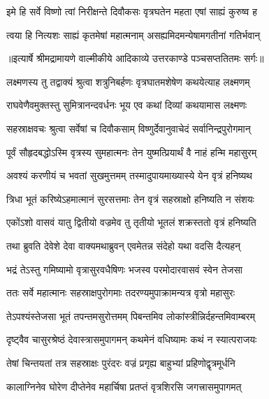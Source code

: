 \twolineshloka
{इमे हि सर्वे विष्णो त्वां निरीक्षन्ते दिवौकसः}
{वृत्रघतेन महता एषां साह्यं कुरुष्व ह} %

\twolineshloka
{त्वया हि नित्यशः साह्यं कृतमेषां महात्मनाम्}
{असह्यमिदमन्येषामगतीनां गतिर्भवान्} %


{॥इत्यार्षे श्रीमद्रामायणे वाल्मीकीये आदिकाव्ये उत्तरकाण्डे पञ्चसप्ततितमः सर्गः॥}


\twolineshloka
{लक्ष्मणस्य तु तद्वाक्यं श्रुत्वा शत्रुनिबर्हणः}
{वृत्रघातमशेषेण कथयेत्याह लक्ष्मणम्} %

\twolineshloka
{राघवेणैवमुक्तस्तु सुमित्रानन्दवर्धनः}
{भूय एव कथां दिव्यां कथयामास लक्ष्मणः} %

\twolineshloka
{सहस्राक्षवचः श्रुत्वा सर्वेषां च दिवौकसाम्}
{विष्णुर्देवानुवाचेदं सर्वानिन्द्रपुरोगमान्} %

\twolineshloka
{पूर्वं सौहृदबद्धोऽस्मि वृत्रस्य सुमहात्मनः}
{तेन युष्मत्प्रियार्थं वै नाहं हन्मि महासुरम्} %

\twolineshloka
{अवश्यं करणीयं च भवतां सुखमुत्तमम्}
{तस्मादुपायमाख्यास्ये येन वृत्रं हनिष्यथ} %

\twolineshloka
{त्रिधा भूतं करिष्येऽहमात्मानं सुरसत्तमाः}
{तेन वृत्रं सहस्राक्षो हनिष्यति न संशयः} %

\twolineshloka
{एकोंऽशो वासवं यातु द्वितीयो वज्रमेव तु}
{तृतीयो भूतलं शक्रस्ततो वृत्रं हनिष्यति} %

\twolineshloka
{तथा ब्रुवति देवेशे देवा वाक्यमथाब्रुवन्}
{एवमेतन्न संदेहो यथा वदसि दैत्यहन्} %

\twolineshloka
{भद्रं तेऽस्तु गमिष्यामो वृत्रासुरवधैषिणः}
{भजस्व परमोदारवासवं स्वेन तेजसा} %

\twolineshloka
{ततः सर्वे महात्मानः सहस्राक्षपुरोगमाः}
{तदरण्यमुपाक्रामन्यत्र वृत्रो महासुरः} %

\twolineshloka
{तेऽपश्यंस्तेजसा भूतं तपन्तमसुरोत्तमम्}
{पिबन्तमिव लोकांस्त्रीन्निर्दहन्तमिवाम्बरम्} %

\twolineshloka
{दृष्ट्वैव चासुरश्रेष्ठं देवास्त्रासमुपागमन्}
{कथमेनं वधिष्यामः कथं न स्यात्पराजयः} %

\twolineshloka
{तेषां चिन्तयतां तत्र सहस्राक्षः पुरंदरः}
{वज्रं प्रगृह्य बाहुभ्यां प्रहिणोद्वृत्रमूर्धनि} %

\twolineshloka
{कालाग्निनेव घोरेण दीप्तेनेव महार्चिषा}
{प्रतप्तं वृत्रशिरसि जगत्त्रासमुपागमत्} %

